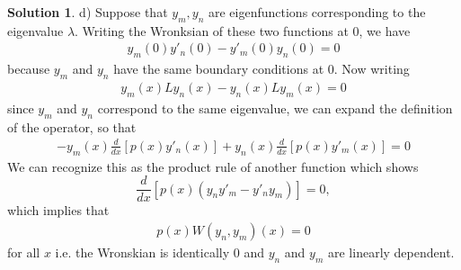 \documentclass[12pt]{article}
\theoremstyle{definition}
\newtheorem{sol}{Solution}
\theoremstyle{remark}
\begin{document}
\begin{sol}

\newpage

    d) Suppose that $y_{m}, y_{n}$ are eigenfunctions corresponding to the eigenvalue $\lambda$. Writing the Wronksian of these two functions at 0, we have
    \begin{align*}
        y_{m}(0) y'_{n}(0) - y'_{m}(0)y_{n}(0) = 0
    \end{align*}
    because $y_{m}$ and $y_{n}$ have the same boundary conditions at 0. Now writing
    \begin{align*}
        y_{m}(x) L y_{n}(x) - y_{n}(x) Ly_{m}(x) = 0
    \end{align*}
    since $y_{m}$ and $y_{n}$ correspond to the same eigenvalue, we can expand the definition of the operator, so that
    \begin{align*}
        - y_{m}(x) \frac{d}{dx}\left[ p(x) y'_{n}(x)\right]
        + y_{n}(x) \frac{d}{dx}\left[ p(x) y'_{m}(x)\right]
        = 0
    \end{align*}
    We can recognize this as the product rule of another function which shows
    \begin{equation*}
        \frac{d}{dx}\left[ p(x)(y_{n} y'_{m} - y'_{n} y_{m})\right] = 0,
    \end{equation*}
    which implies that 
    \begin{align*}
        p(x) W(y_{n}, y_{m})(x) = 0
    \end{align*}
    for all $x$ i.e. the Wronskian is identically 0 and $y_{n}$ and $y_{m}$ are linearly dependent.
\end{sol}
\end{document}
